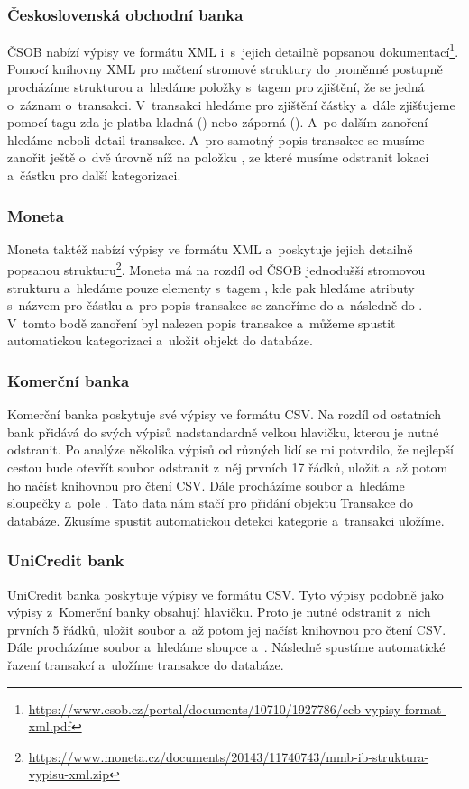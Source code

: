 \subsubsection{Československá obchodní banka}
ČSOB nabízí výpisy ve formátu XML i~s~jejich detailně popsanou dokumentací\footnote{\url{https://www.csob.cz/portal/documents/10710/1927786/ceb-vypisy-format-xml.pdf}}. Pomocí knihovny XML pro načtení stromové struktury do proměnné postupně procházíme strukturou a~hledáme položky s~tagem  pro zjištění, že se jedná o~záznam o~transakci. V~transakci hledáme  pro zjištění částky a~dále zjišťujeme pomocí tagu  zda je platba kladná () nebo záporná (). A~po dalším zanoření hledáme  neboli detail transakce. A~pro samotný popis transakce se musíme zanořit ještě o~dvě úrovně níž na položku , ze které musíme odstranit lokaci a~částku pro další kategorizaci.

\subsubsection{Moneta}
Moneta taktéž nabízí výpisy ve formátu XML a~poskytuje jejich detailně popsanou strukturu\footnote{\url{https://www.moneta.cz/documents/20143/11740743/mmb-ib-struktura-vypisu-xml.zip}}. Moneta má na rozdíl od ČSOB jednodušší stromovou strukturu a~hledáme pouze elementy s~tagem , kde pak hledáme atributy s~názvem  pro částku a~pro popis transakce se zanoříme do  a~následně do . V~tomto bodě zanoření byl nalezen popis transakce a~můžeme spustit automatickou kategorizaci a~uložit objekt do databáze.

\subsubsection{Komerční banka}
Komerční banka poskytuje své výpisy ve formátu CSV. Na rozdíl od ostatních bank přidává do svých výpisů nadstandardně velkou hlavičku, kterou je nutné odstranit. Po analýze několika výpisů od různých lidí se mi potvrdilo, že nejlepší cestou bude otevřít soubor odstranit z~něj prvních 17 řádků, uložit a~až potom ho načíst knihovnou pro čtení CSV. Dále procházíme soubor a~hledáme sloupečky  a~pole . Tato data nám stačí pro přidání objektu Transakce do databáze. Zkusíme spustit automatickou detekci kategorie a~transakci uložíme.

\subsubsection{UniCredit bank}
UniCredit banka poskytuje výpisy ve formátu CSV. Tyto výpisy podobně jako výpisy z~Komerční banky obsahují hlavičku. Proto je nutné  odstranit z~nich prvních 5 řádků, uložit soubor a~až potom jej načíst knihovnou pro čtení CSV. Dále procházíme soubor a~hledáme sloupce  a~. Následně spustíme automatické řazení transakcí a~uložíme transakce do databáze.


